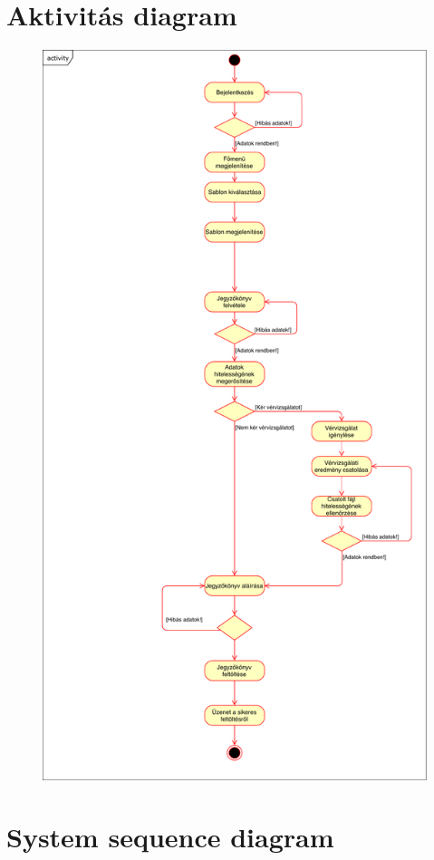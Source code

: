 \newpage
\section{Aktivitás diagram}

\begin{figure}[!h]
	\centering
	\includegraphics[width=120mm, keepaspectratio]{figures/activity.pdf}
\end{figure}
\newpage
\section{System sequence diagram}

